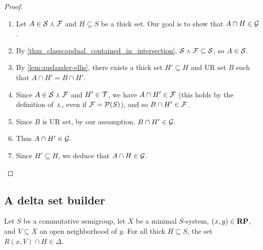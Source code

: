 
\begin{proof}
\leanok{}
\begin{enumerate}
    \item Let $A \in \mathcal{S} \curlywedge \mathcal{F}$ and $H \subseteq S$ be a thick set. Our goal is to show that $A \cap H \in \mathcal{G}$.

    \item By \cref{thm_classcapdual_contained_in_intersection}, $\mathcal{S} \curlywedge \mathcal{F} \subseteq \mathcal{S}$, so $A \in \mathcal{S}$.

    \item By \cref{lem:auslander-ellis}, there exists a thick set $H' \subseteq H$ and UR set $B$ such that $A \cap H' = B \cap H'$.

    \item Since $A \in \mathcal{S} \curlywedge \mathcal{F}$ and $H' \in \mathcal{T}$, we have $A \cap H' \in \mathcal{F}$ (this holds by the definition of $\curlywedge$, even if $\mathcal{F} = \mathcal{P}(S)$), and so $B \cap H' \in \mathcal{F}$. 

    \item Since $B$ is UR set, by our assumption, $B \cap H' \in \mathcal{G}$.

    \item Thus $A \cap H' \in \mathcal{G}$.

    \item Since $H' \subseteq H$, we deduce that $A \cap H \in \mathcal{G}$.
    \end{enumerate}
\end{proof}

\subsection{A delta set builder}

\begin{theorem}
\label{thm_delta_from_kronecker}
\leanok{}
    Let $S$ be a commutative semigroup, let $X$ be a minimal $S$-system, $(x, y) \in \mathbf{RP}$, and $V \subseteq X$ an open neighborhood of $y$.  For all thick $H \subseteq S$, the set $R(x,V) \cap H \in \Delta$.
\end{theorem}

